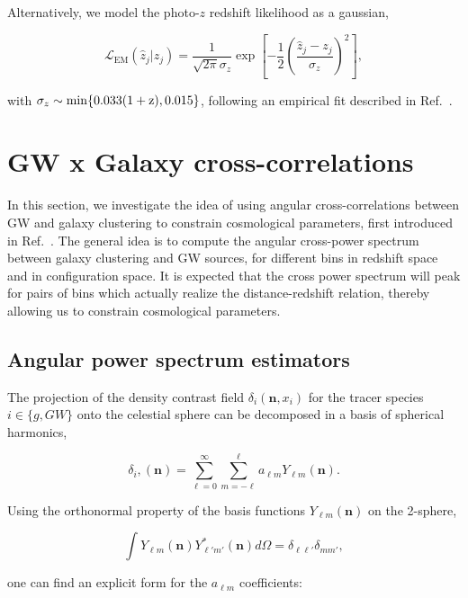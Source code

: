 \documentclass[%
preprint,
nofootinbib,
 amsmath,amssymb,
 aps,
]{revtex4-2}
\begin{document}
Alternatively, we model the photo-$z$ redshift likelihood as a gaussian,

\begin{equation}
	\label{eq:stat:photo-z-likelihood}
	\mathcal{L}_\text{EM}(\hat{z}_j | z_j) = \frac{1}{\sqrt{2 \pi} \sigma_z} \exp{\left [-\frac{1}{2} \left (\frac{\hat{z}_j - z_j}{\sigma_z} \right )^2 \right ]},
\end{equation}

with $\sigma_z \sim \rm{min}\{0.033(1+z), 0.015\}$, following an empirical fit described in
Ref.~.

\section{GW x Galaxy cross-correlations}

In this section, we investigate the idea of using angular cross-correlations between GW and galaxy
clustering to constrain cosmological parameters, first introduced in Ref.~\cite{Oguri_2016}. The
general idea is to compute the angular cross-power spectrum between galaxy clustering and GW
sources, for different bins in redshift space and in configuration space. It is expected that the
cross power spectrum will peak for pairs of bins which actually realize the distance-redshift
relation, thereby allowing us to constrain cosmological parameters.

\subsection{Angular power spectrum estimators}

The projection of the density contrast field $\delta_i(\bm{n}, x_i)$ for the tracer species $i \in
	\{g, GW\}$ onto the celestial sphere can be decomposed in a basis of spherical harmonics,

\begin{equation}
	\delta_i, (\bm{n}) = \sum_{\ell = 0}^{\infty} \sum_{m = -\ell}^{\ell} a_{\ell m} Y_{\ell m}(\bm{n}).
\end{equation}

Using the orthonormal property of the basis functions $Y_{\ell m}(\bm{n})$ on the 2-sphere,

\begin{equation}
	\int Y_{\ell m} (\bm{n}) Y^*_{\ell' m'} (\bm{n}) d\Omega = \delta_{\ell \ell'} \delta_{m m'},
\end{equation}

one can find an explicit form for the $a_{\ell m}$ coefficients:
\end{document}
